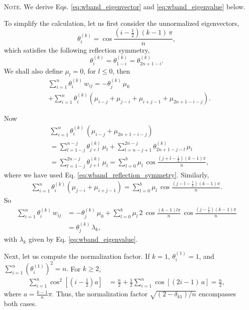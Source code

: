 \documentclass[reprint]{revtex4-1}
\newcommand{\note}[1]{{\color{DarkGreen}\footnotesize \textsc{Note.} #1}}
\begin{document}
\note{We derive Eqs.
  \eqref{eq:wband_eigenvector} and \eqref{eq:wband_eigenvalue}
  below.

  To simplify the calculation,
  let us first consider the unnormalized eigenvectors,
  $$
  \theta^{(k)}_i
  =
  \cos \frac{ \left(i - \frac12\right) (k - 1) \, \pi}{n},
  $$
  which satisfies the following reflection symmetry,
  \begin{equation}
    \theta^{(k)}_i = \theta^{(k)}_{1-i} = \theta^{(k)}_{2n+1-i}.
    \label{eq:wband_reflection_symmetry}
  \end{equation}
  We shall also define $\mu_l = 0$, for $l \le 0$, then
$$
\begin{aligned}
&\sum_{i = 1}^n
  \theta^{(k)}_i
  \, w_{ij}
=
- \theta^{(k)}_j \, \mu_0
\\
&
+\sum_{i=1}^n
  \theta^{(k)}_i
  \left(
    \mu_{i - j} + \mu_{j - i} + \mu_{i + j - 1} + \mu_{2n+1-i-j}
  \right)
.
\end{aligned}
$$

Now
$$
\begin{aligned}
  &
  \sum_{i=1}^n
  \theta^{(k)}_i \,
  \left(
    \mu_{i - j} + \mu_{2n+1-i-j}
  \right)
  \\
  &=
  \sum_{l=1-j}^{n-j} \theta^{(k)}_{j+l} \, \mu_l
  +
  \sum_{l=n-j+1}^{2n-j} \theta^{(k)}_{2n+1-j-l} \, \mu_l
  \\
  &=
  \sum_{l=1-j}^{2n-j} \theta^{(k)}_{j+l} \, \mu_l
  =
  \sum_{l=0}^{b} \mu_l \, \cos\frac{(j+l-\frac12)(k-1)\pi}{n},
\end{aligned}
$$
where we have used Eq. \eqref{eq:wband_reflection_symmetry}.
%
Similarly,
$$
\begin{aligned}
  \sum_{i=1}^n
  \theta^{(k)}_i
  \left(
    \mu_{j - i} + \mu_{i+j-1}
  \right)
  =
  \sum_{l=0}^{b} \mu_l \, \cos\frac{(j-l-\frac12)(k-1)\pi}{n}.
\end{aligned}
$$
%
So
$$
\begin{aligned}
\sum_{i = 1}^n \theta^{(k)}_i \, w_{ij}
&=
- \theta^{(k)}_j \, \mu_0
+\sum_{l=0}^{b} \mu_l \, 2 \, \cos\frac{(k-1)l\pi}{n} \, \cos\frac{(j-\frac12)(k-1)\pi}{n}
\\
&= \theta^{(k)}_j \, \lambda_k,
\end{aligned}
$$
with $\lambda_k$ given by Eq. \eqref{eq:wband_eigenvalue}.

Next, let us compute the normalization factor.
%
If $k = 1$, $\theta^{(1)}_i = 1$, and
$
\sum_{i = 1}^n \left( \theta^{(1)}_i \right)^2 = n.
$
For $k \ge 2$,
$$
\begin{aligned}
  \sum_{i = 1}^n \cos^2 \left[\left(i - \frac1 2 \right) a\right]
  &=
  \frac n 2
  +
  \frac 1 2
  \sum_{i = 1}^n \cos\left[(2 i - 1)\, a \right]
  =
  \frac n 2,
\end{aligned}
$$
where $a = \frac{k-1}{n} \pi$.
Thus, the normalization factor $\sqrt{(2 - \delta_{k1})/n}$
encompasses both cases.

}
\end{document}

